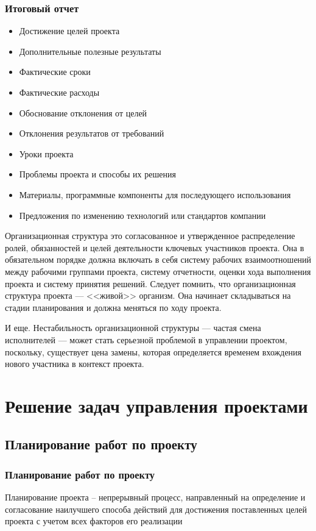 \documentclass{../industrial-development}
\begin{document}
    \begin{frame} \frametitle{Итоговый отчет}
        \begin{itemize}
            \item Достижение целей проекта
            \item Дополнительные полезные результаты
            \item Фактические сроки
            \item Фактические расходы
            \item Обоснование отклонения от целей
            \item Отклонения результатов от требований
            \item Уроки проекта
            \item Проблемы проекта и способы их решения
            \item Материалы, программные компоненты для последующего использования
            \item Предложения по изменению технологий или стандартов компании
        \end{itemize}
    \end{frame}
    \lecturenotes
Организационная структура это согласованное и утвержденное распределение ролей, обязанностей и целей деятельности ключевых участников проекта. Она в обязательном порядке должна включать в себя систему рабочих взаимоотношений между рабочими группами проекта, систему отчетности, оценки хода выполнения проекта и систему принятия решений. Следует помнить, что организационная структура проекта — <<живой>> организм. Она начинает складываться на стадии планирования и должна меняться по ходу проекта.

И еще. Нестабильность организационной структуры — частая смена исполнителей — может стать серьезной проблемой в управлении проектом, поскольку, существует цена замены, которая определяется временем вхождения нового участника в контекст проекта.

    \section{Решение задач управления проектами}

    \subsection{Планирование работ по проекту}

    \begin{frame} \frametitle{Планирование работ по проекту}
        \begin{definition}
            \alert{Планирование проекта} – непрерывный процесс, направленный на определение и согласование наилучшего способа действий для достижения поставленных целей проекта с учетом всех факторов его реализации
        \end{definition}
    \end{frame}
    \lecturenotes
\end{document}
